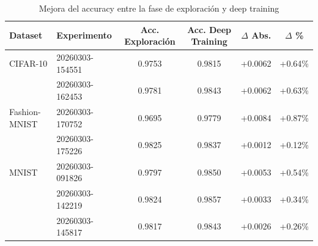 \begin{table}[htbp]
\centering
\caption{Mejora del accuracy entre la fase de exploración y deep training}
\label{tab:mejora_fases}
\small
\begin{tabular}{llcccc}
\toprule
\textbf{Dataset} & \textbf{Experimento} & \textbf{Acc. Exploración} & \textbf{Acc. Deep Training} & \textbf{$\Delta$ Abs.} & \textbf{$\Delta$ \%} \\
\midrule
  CIFAR-10 & 20260303-154551 & 0.9753 & 0.9815 & +0.0062 & +0.64\% \\
   & 20260303-162453 & 0.9781 & 0.9843 & +0.0062 & +0.63\% \\
\midrule
  Fashion-MNIST & 20260303-170752 & 0.9695 & 0.9779 & +0.0084 & +0.87\% \\
   & 20260303-175226 & 0.9825 & 0.9837 & +0.0012 & +0.12\% \\
\midrule
  MNIST & 20260303-091826 & 0.9797 & 0.9850 & +0.0053 & +0.54\% \\
   & 20260303-142219 & 0.9824 & 0.9857 & +0.0033 & +0.34\% \\
   & 20260303-145817 & 0.9817 & 0.9843 & +0.0026 & +0.26\% \\
\bottomrule
\end{tabular}
\end{table}
